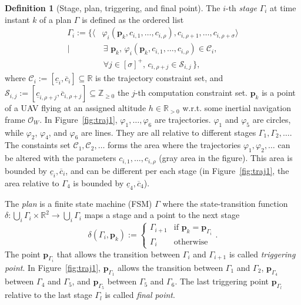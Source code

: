 \documentclass[letterpaper,10pt,conference]{ieeeconf}
\theoremstyle{definition}
\newtheorem{defn}{Definition}[section]
\begin{document}
\begin{defn}[Stage, plan, triggering, and final point]\label{def:mission}
  The $i$-th \emph{stage} $\Gamma_i$ at time instant $k$ of a plan $\Gamma$ is defined as the ordered list
  \begin{equation*}\begin{split}
    \Gamma_i:=\{\langle&\varphi_i(\mathbf{p}_k,c_{i,1},\dots,c_{i,\rho}),c_{i,\rho+1},\dots,c_{i,\rho+\sigma}\rangle\\\mid
    &\,\exists\,\,\mathbf{p}_k,\,\varphi_i(\mathbf{p}_k,c_{i,1},\dots,c_{i,\rho})\in\mathcal{C}_i,\,\\
      &\,\forall j\in[\sigma]^+,\,c_{i,\rho+j}\in\mathcal{S}_{i,j}\,\},
  \end{split}\end{equation*}
  where $\mathcal{C}_i:=[\underline{c}_i,\overline{c}_i]\subseteq\mathbb{R}$ is the trajectory constraint set, and $\mathcal{S}_{i,j}:=[\underline{c}_{i,\rho+j},\overline{c}_{i,\rho+j}]\subseteq\mathbb{Z}_{\geq 0}$ the $j$-th computation constraint set. $\mathbf{p}_k$ is a point of a UAV flying at an assigned altitude $h\in\mathbb{R}_{>0}$ w.r.t. some inertial navigation frame $\mathcal{O}_W$. In Figure~\ref{fig:traj1}, $\varphi_1,\dots,\varphi_6$ are trajectories. $\varphi_1$ and $\varphi_5$ are circles, while $\varphi_2$, $\varphi_4$, and $\varphi_6$ are lines. They are all relative to different stages $\Gamma_1,\Gamma_2,\dots$. The constaints set $\mathcal{C}_1,\mathcal{C}_2,\dots$ forms the area where the trajectories $\varphi_1,\varphi_2,\dots$ can be altered with the parameters $c_{i,1},\dots,c_{i,\rho}$ (gray area in the figure). This area is bounded by $\underline{c}_i,\overline{c}_i$, and can be different per each stage (in Figure~\ref{fig:traj1}, the area relative to $\Gamma_4$ is bounded by $\underline{c}_4,\overline{c}_4$).

  The \emph{plan} is a finite state machine (FSM) $\Gamma$ where the state-transition function $\delta:\bigcup_i{\Gamma_i}\times\mathbb{R}^2\rightarrow\bigcup_i{\Gamma_i}$ maps a stage and a point to the next stage
  \begin{equation*}\delta(\Gamma_i,\mathbf{p}_k):=\begin{cases}
    \Gamma_{i+1} & \text{if }\mathbf{p}_k=\mathbf{p}_{\Gamma_i}\\
    \Gamma_i & \text{otherwise}
  \end{cases}.\end{equation*}
  The point $\mathbf{p}_{\Gamma_{i}}$ that allows the transition between $\Gamma_i$ and $\Gamma_{i+1}$ is called \emph{triggering point}. In Figure~\ref{fig:traj1}, $\mathbf{p}_{\Gamma_1}$ allows the transition between $\Gamma_1$ and $\Gamma_2$, $\mathbf{p}_{\Gamma_4}$ between $\Gamma_4$ and $\Gamma_5$, and $\mathbf{p}_{\Gamma_5}$ between $\Gamma_5$ and $\Gamma_6$. The last triggering point $\mathbf{p}_{\Gamma_{l}}$ relative to the last stage $\Gamma_l$ is called \emph{final point}.
\end{defn}
\end{document}

